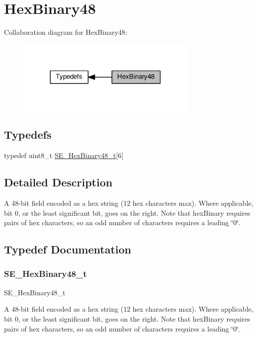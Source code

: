 \hypertarget{group__HexBinary48}{}\section{Hex\+Binary48}
\label{group__HexBinary48}
Collaboration diagram for Hex\+Binary48\+:\nopagebreak
\begin{figure}[H]
\begin{center}
\leavevmode
\includegraphics[width=246pt]{group__HexBinary48}
\end{center}
\end{figure}
\subsection*{Typedefs}
\begin{DoxyCompactItemize}
\item 
typedef uint8\+\_\+t \hyperlink{group__HexBinary48_ga2e5cfe0491012f1652355a07a5dd4579}{S\+E\+\_\+\+Hex\+Binary48\+\_\+t}\mbox{[}6\mbox{]}
\end{DoxyCompactItemize}


\subsection{Detailed Description}
A 48-\/bit field encoded as a hex string (12 hex characters max). Where applicable, bit 0, or the least significant bit, goes on the right. Note that hex\+Binary requires pairs of hex characters, so an odd number of characters requires a leading \char`\"{}0\char`\"{}. 

\subsection{Typedef Documentation}
\mbox{\label{group__HexBinary48_ga2e5cfe0491012f1652355a07a5dd4579}} 
\subsubsection{\texorpdfstring{S\+E\+\_\+\+Hex\+Binary48\+\_\+t}{SE\_HexBinary48\_t}}
{\footnotesize\ttfamily S\+E\+\_\+\+Hex\+Binary48\+\_\+t}

A 48-\/bit field encoded as a hex string (12 hex characters max). Where applicable, bit 0, or the least significant bit, goes on the right. Note that hex\+Binary requires pairs of hex characters, so an odd number of characters requires a leading \char`\"{}0\char`\"{}. 